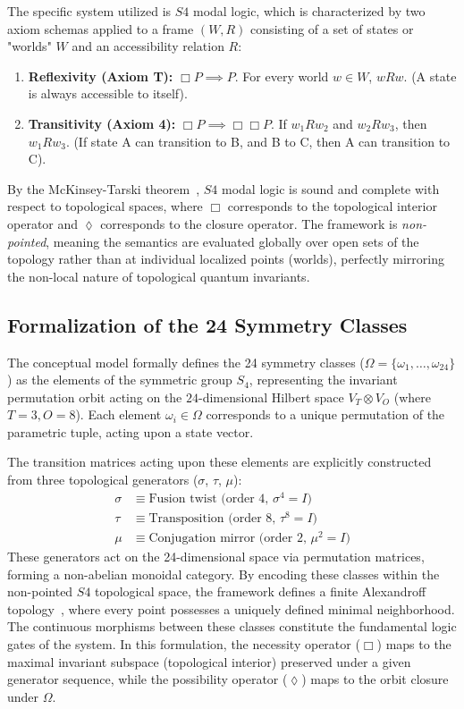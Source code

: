 The specific system utilized is $S4$ modal logic, which is characterized by two axiom schemas applied to a frame $(W, R)$ consisting of a set of states or "worlds" $W$ and an accessibility relation $R$:
\begin{enumerate}
    \item \textbf{Reflexivity (Axiom T):} $\Box P \implies P$. For every world $w \in W$, $wRw$. (A state is always accessible to itself).
    \item \textbf{Transitivity (Axiom 4):} $\Box P \implies \Box\Box P$. If $w_1Rw_2$ and $w_2Rw_3$, then $w_1Rw_3$. (If state A can transition to B, and B to C, then A can transition to C).
\end{enumerate}
By the McKinsey-Tarski theorem~\cite{mckinsey1944}, $S4$ modal logic is sound and complete with respect to topological spaces, where $\Box$ corresponds to the topological interior operator and $\lozenge$ corresponds to the closure operator. The framework is \textit{non-pointed}, meaning the semantics are evaluated globally over open sets of the topology rather than at individual localized points (worlds), perfectly mirroring the non-local nature of topological quantum invariants.

\subsection{Formalization of the 24 Symmetry Classes}
The conceptual model formally defines the 24 symmetry classes ($\Omega = \{\omega_1, \dots, \omega_{24}\}$) as the elements of the symmetric group $S_4$, representing the invariant permutation orbit acting on the $24$-dimensional Hilbert space $V_T \otimes V_O$ (where $T=3, O=8$). Each element $\omega_i \in \Omega$ corresponds to a unique permutation of the parametric tuple, acting upon a state vector. 

The transition matrices acting upon these elements are explicitly constructed from three topological generators ($\sigma$, $\tau$, $\mu$):
\begin{align}
    \sigma &\equiv \text{Fusion twist (order 4, $\sigma^4 = I$)} \\
    \tau &\equiv \text{Transposition (order 8, $\tau^8 = I$)} \\
    \mu &\equiv \text{Conjugation mirror (order 2, $\mu^2 = I$)}
\end{align}
These generators act on the 24-dimensional space via permutation matrices, forming a non-abelian monoidal category. By encoding these classes within the non-pointed $S4$ topological space, the framework defines a finite Alexandroff topology~\cite{alexandroff1937}, where every point possesses a uniquely defined minimal neighborhood. The continuous morphisms between these classes constitute the fundamental logic gates of the system. In this formulation, the necessity operator ($\Box$) maps to the maximal invariant subspace (topological interior) preserved under a given generator sequence, while the possibility operator ($\lozenge$) maps to the orbit closure under $\Omega$.

